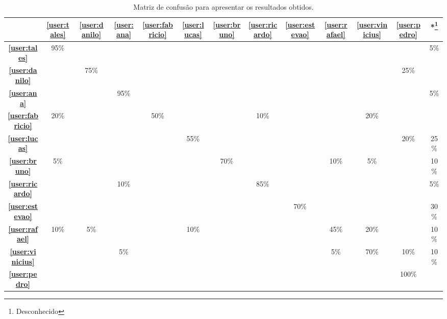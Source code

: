 	
	\begin{table}[H]
		\begin{center}
			\caption{Matriz de confusão para apresentar os resultados obtidos.}
			\label{tab:matriz-confusao}
			\begin{tabular}{|c|c|c|c|c|c|c|c|c|c|c|c|c|}
				\hline  & \bf \ref{user:tales} & \bf \ref{user:danilo} & \bf
				\ref{user:ana} & \bf \ref{user:fabricio} & \bf \ref{user:lucas} & \bf
				\ref{user:bruno} & \bf \ref{user:ricardo} & \bf \ref{user:estevao} & \bf \ref{user:rafael} &
				\bf \ref{user:vinicius} & \bf \ref{user:pedro} & \bf
				*\footnote[1]{Desconhecido}\\
				
				\hline \bf \ref{user:tales} 		& 95\% & 			& 		 & 			&   	 & 			& 		 & 			& 		 & 			& 		 & 5\%	\\ 
				\hline \bf \ref{user:danilo} 	& 		 & 75\% & 		 & 			&   	 & 			& 		 & 			& 		 & 			& 25\% &		 	\\
				\hline \bf \ref{user:ana} 			& 		 & 			& 95\% & 			&   	 & 			& 		 & 			& 		 & 			& 		 & 5\%  \\
				\hline \bf \ref{user:fabricio} & 20\% & 			& 		 & 50\% &      & 			& 10\% & 			&  	   & 20\% & 		 &		  \\
				\hline \bf \ref{user:lucas} 		& 		 & 			& 		 & 			& 55\% & 			& 		 & 			& 		 & 			& 20\% & 25\% \\
				\hline \bf \ref{user:bruno} 		& 5\%	 & 			& 		 & 			& 		 & 70\% & 		 & 			& 10\% & 	5\%	& 		 & 10\%	\\
				\hline \bf \ref{user:ricardo} 	& 		 & 			& 10\% & 			& 		 & 			& 85\% & 			& 		 & 			& 		 & 5\%  \\
				\hline \bf \ref{user:estevao} 	& 		 & 			& 		 & 			& 		 & 			& 		 & 70\% & 		 & 			& 		 & 30\% \\
				\hline \bf \ref{user:rafael} 	& 10\% & 	5\%	& 		 & 			& 10\% & 			& 		 & 			& 45\% & 20\% & 		 & 10\% \\
				\hline \bf \ref{user:vinicius} & 		 & 			& 5\%  & 			& 		 & 			& 		 & 			& 5\%  & 70\% & 10\% & 10\% \\
				\hline \bf \ref{user:pedro} 		& 		 & 			& 		 & 			& 		 & 			& 		 & 			& 		 & 			& 100\%&		  \\
				\hline
			\end{tabular}
		\end{center}
	\end{table}

